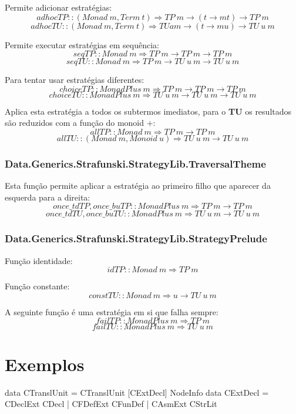 Permite adicionar estratégias:
$$adhocTP :: (Monad~m, Term~t) \Rightarrow TP~m \rightarrow (t \rightarrow m t) \rightarrow TP~m$$
$$adhocTU :: (Monad~m, Term~t) \Rightarrow TU a m \rightarrow (t \rightarrow m u) \rightarrow TU~u~m$$

Permite executar estratégias em sequência:
$$seqTP :: Monad~m \Rightarrow TP~m \rightarrow TP~m \rightarrow TP~m$$
$$seqTU :: Monad~m \Rightarrow TP~m \rightarrow TU~u~m \rightarrow TU~u~m$$


Para tentar usar estratégias diferentes:
$$choiceTP :: MonadPlus~m \Rightarrow TP~m \rightarrow TP~m \rightarrow TP~m$$
$$choiceTU :: MonadPlus~m \Rightarrow TU~u~m \rightarrow TU~u~m \rightarrow TU~u~m$$

Aplica esta estratégia a todos os subtermos imediatos, para o \textbf{TU} os resultados são reduzidos com a função do monoid $+$:
$$allTP :: Monad~m \Rightarrow TP~m \rightarrow TP~m$$
$$allTU :: (Monad~m, Monoid~u) \Rightarrow TU~u~m \rightarrow TU~u~m$$

\subsubsection{Data.Generics.Strafunski.StrategyLib.TraversalTheme}

Esta função permite aplicar a estratégia ao primeiro filho que aparecer da esquerda para a direita:
$$once\_tdTP,once\_buTP :: MonadPlus~m \Rightarrow TP~m \rightarrow TP~m$$
$$once\_tdTU, once\_buTU :: MonadPlus~m \Rightarrow TU~u~m \rightarrow TU~u~m$$

\subsubsection{Data.Generics.Strafunski.StrategyLib.StrategyPrelude}

Função identidade:
$$idTP :: Monad~m \Rightarrow TP~m$$

Função constante:
$$constTU :: Monad~m \Rightarrow u \rightarrow TU~u~m$$

A seguinte função é uma estratégia em si que falha sempre:
$$failTP :: MonadPlus~m \Rightarrow TP~m$$
$$failTU :: MonadPlus~m \Rightarrow TU~u~m$$

\section{Exemplos}
\begin{haskell}
data CTranslUnit = CTranslUnit [CExtDecl] NodeInfo
data CExtDecl = CDeclExt CDecl
              | CFDefExt CFunDef
              | CAsmExt CStrLit
\end{haskell}

